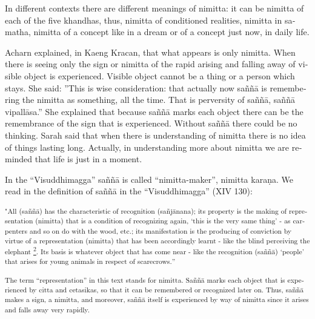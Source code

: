 \textdutch{In different contexts there are different meanings of
nimitta: it can be nimitta of each of the five khandhas, thus, nimitta
of conditioned realities, nimitta in samatha, nimitta of a concept like
in a dream or of a concept just now, in daily life. }

\textdutch{Acharn explained, in Kaeng Kracan, that what appears is only
nimitta. When there is seeing only the sign or nimitta of the rapid
arising and falling away of visible object is experienced. Visible
object cannot be a thing or a person which stays. She said: ''This is
wise consideration: that actually now saññā is remembering the nimitta
as something, all the time. That is perversity of saññā, saññā
vipallāsa.'' She explained that because saññā marks each object there
can be the remembrance of the sign that is experienced. Without saññā
there could be no thinking. Sarah said that when there is understanding
of nimitta there is no idea of things lasting long. Actually, in
understanding more about nimitta we are reminded that life is just in a
moment. }

\textdutch{In the ``Visuddhimagga'' saññā is called ``nimitta-maker'',
nimitta karaṇa. We read in the definition of saññā in the
``Visuddhimagga'' }(XIV 130)\textdutch{:}

\textsuperscript{{{"}}{{All
(sa}}{{ññ}}{{ā}}\textenglish[variant=american]{{{) has the
characteristic of recognition
(sa}}}{{ñ}}{{j}}{{ā}}\textenglish[variant=american]{{{nana); its
property is the making of representation (nimitta) that is a condition
of recognizing again, `this is the very same thing' - as carpenters and
so on do with the wood, etc.; its manifestation is the producing of
conviction by virtue of a representation (nimitta) that has been
accordingly learnt - like the blind perceiving the
elephant}}}\textdutch{{{
\protect\hyperlink{sdfootnote2sym}{\textsuperscript{2}}}}}\textenglish[variant=american]{{{.
Its basis is whatever object that has come near - like the recognition
(sa}}}{{ññ}}{{ā}}\textenglish[variant=american]{{{) `people' that arises
for young animals in respect of scarecrows.}}}\textdutch{{{''}}}}

\textsuperscript{\textdutch{{{The term ``representation'' in this text
stands for nimitta. Saññā marks each object that is experienced by citta
and cetasikas, so that it can be remembered or recognized later on.
Thus, saññā makes a sign, a nimitta, and moreover, saññā itself is
experienced by way of nimitta since it arises and falls away very
rapidly. }}}}

